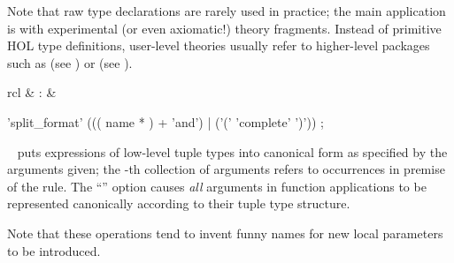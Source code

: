 \begin{isabellebody}
\begin{isamarkuptext}
  Note that raw type declarations are rarely used in practice; the
  main application is with experimental (or even axiomatic!) theory
  fragments.  Instead of primitive HOL type definitions, user-level
  theories usually refer to higher-level packages such as \hyperlink{command.HOL.record}{\mbox{}} (see ) or \hyperlink{command.HOL.datatype}{\mbox{}} (see ).%
\end{isamarkuptext}%
\isamarkuptrue%
%
\isamarkuptrue%
%
\begin{isamarkuptext}%
\begin{matharray}{rcl}
    \hyperlink{attribute.HOL.split-format}{\mbox{}}\isa{{\isachardoublequote}\isactrlsup {\isacharasterisk}{\isachardoublequote}} & : &  \\
  \end{matharray}

  \begin{rail}
    'split\_format' ((( name * ) + 'and') | ('(' 'complete' ')'))
    ;
  \end{rail}

  \begin{description}
  
  \item \hyperlink{attribute.HOL.split-format}{\mbox{}}~ puts expressions of low-level tuple types into
  canonical form as specified by the arguments given; the -th
  collection of arguments refers to occurrences in premise 
  of the rule.  The ``'' option causes \emph{all}
  arguments in function applications to be represented canonically
  according to their tuple type structure.

  Note that these operations tend to invent funny names for new local
  parameters to be introduced.


\end{description}
\end{isamarkuptext}
\end{isabellebody}
